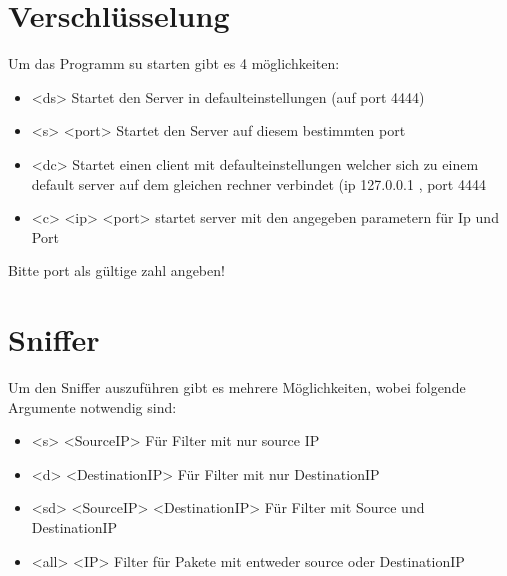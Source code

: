 \documentclass[a4paper,12pt]{scrreprt}
\begin{document}
\section{Verschlüsselung}
	Um das Programm su starten gibt es 4 möglichkeiten:
	\begin{itemize}
	\item <ds> Startet den Server in defaulteinstellungen (auf port 4444)
	\item <s> <port> Startet den Server auf diesem bestimmten port
	\item <dc> Startet einen client mit defaulteinstellungen welcher sich zu einem default server auf dem gleichen rechner verbindet (ip 127.0.0.1 , port 4444
	\item <c> <ip> <port> startet server mit den angegeben parametern für Ip und Port
	\end{itemize}
	
	Bitte port als gültige zahl angeben!
\section{Sniffer}
	Um den Sniffer auszuführen gibt es mehrere Möglichkeiten, wobei folgende Argumente notwendig sind:
	\begin{itemize}
	\item <s> <SourceIP> Für Filter mit nur source IP 
	\item <d> <DestinationIP> Für Filter mit nur DestinationIP
	\item <sd> <SourceIP> <DestinationIP> Für Filter mit Source und DestinationIP
	\item <all> <IP> Filter für Pakete mit entweder source oder DestinationIP
	\end{itemize} 
\end{document}
